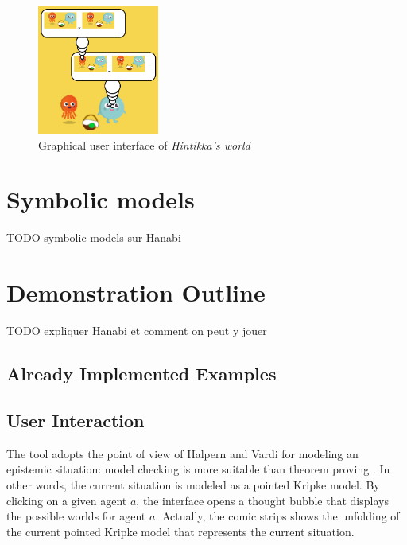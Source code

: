 \documentclass{article}
\begin{document}
\begin{figure}
	\begin{center}
		\includegraphics[width=4cm]{screenshot.png}
	\end{center}
	\caption{Graphical user interface of \emph{Hintikka's world}\label{figure:gui}}
\end{figure}

\section{Symbolic models}

TODO symbolic models sur Hanabi


\section{Demonstration Outline}
\label{section:demonstration}

TODO expliquer Hanabi et comment on peut y jouer


\subsection{Already Implemented Examples}




\subsection{User Interaction}

The tool adopts the point of view of Halpern and Vardi for modeling an epistemic situation: model checking is more suitable than theorem proving \cite{DBLP:conf/kr/HalpernV91}. In other words, the current situation is modeled as a pointed Kripke model.
By clicking on a given agent $a$, the interface opens a thought bubble that displays the possible worlds for agent $a$. Actually, the comic strips shows the unfolding of the current pointed Kripke model that represents the current situation.
\end{document}

